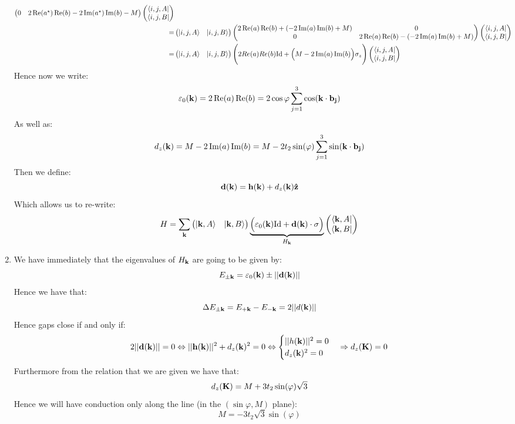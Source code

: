 \documentclass[10pt,a4paper]{article}
\begin{document}
\begin{enumerate}
\begin{align*}
\begin{pmatrix}
0 & 2 \Re(a^\star) \Re(b) - 2 \Im(a^\star) \Im(b) - M
\end{pmatrix}
\begin{pmatrix}
\bra{i, j, A}\\
\bra{i, j, B}
\end{pmatrix}
\\
=
&\begin{pmatrix}
\ket{i, j, A} & \ket{i, j, B}
\end{pmatrix} \begin{pmatrix}
2 \Re(a)\Re(b) + (-2 \Im(a) \Im(b) + M)& 0\\
0 & 2 \Re(a) \Re(b) - (-2 \Im(a) \Im(b) + M) 
\end{pmatrix}
\begin{pmatrix}
\bra{i, j, A}\\
\bra{i, j, B}
\end{pmatrix}
\\
=
&\begin{pmatrix}
\ket{i, j, A} & \ket{i, j, B}
\end{pmatrix} \Bigg(2 Re(a) Re(b) \text{Id} + \Big(M - 2 \Im(a) \Im(b) \Big) \sigma_z \Bigg)
\begin{pmatrix}
\bra{i, j, A}\\
\bra{i, j, B}
\end{pmatrix}
\end{align*}
Hence now we write:
\[
\varepsilon_0(\vb{k}) = 2 \Re(a) \Re(b) = 2 \cos\varphi \sum_{j = 1}^3 \cos(\vb{k} \cdot \vb{b_j})
\]
As well as:
\[
d_z(\vb{k}) = M - 2 \Im(a) \Im(b) = M - 2 t_2 \sin(\varphi) \sum_{j = 1}^3 \sin(\vb{k} \cdot \vb{b_j})
\]
Then we define:
\[
\vb{d}(\vb{k}) = \vb{h}(\vb{k}) + d_z(\vb{k}) \vu{z}
\]
Which allows us to re-write:
\[
H = \sum_{\vb{k}} \begin{pmatrix}
\ket{\vb{k}, A} & \ket{\vb{k}, B}
\end{pmatrix}
\underbrace{\Big( \varepsilon_0(\vb{k}) \text{Id} + \vb{d}(\vb{k}) \cdot \vb{\sigma} \Big)}_{H_{\vb{k}}} \begin{pmatrix}
\bra{\vb{k}, A}\\
\bra{\vb{k}, B}
\end{pmatrix}
\]

\item We have immediately that the eigenvalues of $H_{\vb{k}}$ are going to be given by:
\[
E_{\pm\vb{k}} = \varepsilon_0(\vb{k}) \pm ||\vb{d}(\vb{k})||
\]
Hence we have that:
\[
\Delta E_{\pm \vb{k}} = E_{+\vb{k}} - E_{-\vb{k}} = 2 ||d(\vb{k})||
\]
Hence gaps close if and only if:
\[
2||\vb{d}(\vb{k})|| = 0 \Leftrightarrow ||\vb{h}(\vb{k})||^2 + d_z(\vb{k})^2 = 0 \Leftrightarrow \begin{cases}
||h(\vb{k})||^2 = 0\\
d_z(\vb{k})^2 = 0
\end{cases} \Rightarrow d_z(\vb{K}) = 0
\]
Furthermore from the relation that we are given we have that:
\[
d_z(\vb{K}) = M + 3 t_2 \sin(\varphi)\sqrt{3}
\]
Hence we will have conduction only along the line (in the $(\sin\varphi, M)$ plane):
\[
M = - 3 t_2 \sqrt{3} \sin(\varphi)
\]


\end{enumerate}
\end{document}
